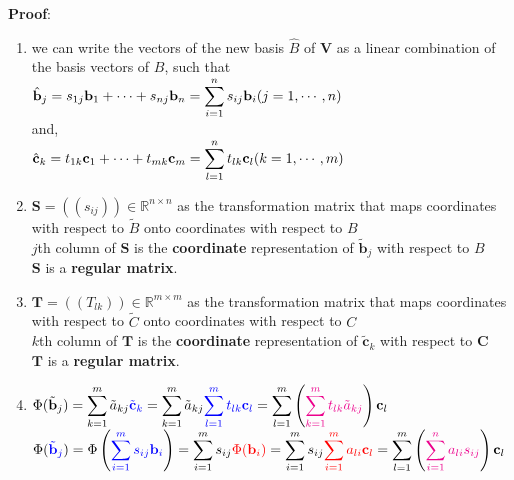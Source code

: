 \vspace{0.2cm}
\noindent \textbf{Proof}:
\begin{enumerate}
    \item we can write the vectors of the new basis $\hat{\mathit{B}}$ of $\mathbf{V}$ as a linear combination of the basis vectors of $\mathit{B}$, such that\\
    \(
        \displaystyle \hat{\mathbf{b}}_j = s_{1j}\mathbf{b}_1 + \cdots + s_{nj}\mathbf{b}_n = \sum_{i=1}^{n} s_{ij}\mathbf{b}_i \hfill (j = 1,\cdots,n)
    \)\\
    and,\\
    \(
        \displaystyle \hat{\mathbf{c}}_k = t_{1k}\mathbf{c}_1 + \cdots + t_{mk}\mathbf{c}_m = \sum_{l=1}^{n} t_{lk}\mathbf{c}_l \hfill (k = 1,\cdots,m)
    \)

    \item $\mathbf{S} = ((s_{ij})) \in \mathbb{R}^{n\times n}$ as the transformation matrix that maps coordinates with respect to $\tilde{\mathit{B}}$ onto coordinates with respect to $\mathit{B}$\\
    $j$th column of $\mathbf{S}$ is the \textbf{coordinate} representation of  $\tilde{\mathbf{b}}_j$ with respect to $\mathit{B}$\\
    $\mathbf{S}$ is a \textbf{regular matrix}.
    
    
    \item $\mathbf{T} = ((T_{lk})) \in \mathbb{R}^{m\times m}$ as the transformation matrix that maps coordinates with respect to $\tilde{\mathit{C}}$ onto coordinates with respect to $\mathit{C}$\\
    $k$th column of $\mathbf{T}$ is the \textbf{coordinate} representation of $\tilde{\mathbf{c}}_k$ with respect to $\mathbf{C}$\\
    $\mathbf{T}$ is a \textbf{regular matrix}.

    \item \( \displaystyle
        \Phi(\tilde{\mathbf{b}}_j) = \sum_{k=1}^{m} \tilde{a}_{kj}\textcolor{blue}{\tilde{\mathbf{c}}_k} = \sum_{k=1}^{m} \tilde{a}_{kj} \textcolor{blue}{\sum_{l=1}^{m} t_{lk} \mathbf{c}_l} = \sum_{l=1}^{m}\left( \textcolor{Magenta}{\sum_{k=1}^{m} t_{lk}\tilde{a}_{kj}} \right)\mathbf{c}_l
    \)  \\
    \( \displaystyle
     \Phi(\textcolor{blue}{\tilde{\mathbf{b}}_j}) = \Phi \left( \textcolor{blue}{\sum_{i=1}^{m} s_{ij}\mathbf{b}_i} \right) = \sum_{i=1}^{m} s_{ij} \textcolor{red}{\Phi(\mathbf{b}_i)} = \sum_{i=1}^{m} s_{ij} \textcolor{red}{\sum_{i=1}^{m} a_{li}\mathbf{c}_l} = \sum_{l=1}^{m}\left( \textcolor{Magenta}{\sum_{i=1}^{n} a_{li}s_{ij}} \right)\mathbf{c}_l
    \)


\end{enumerate}

